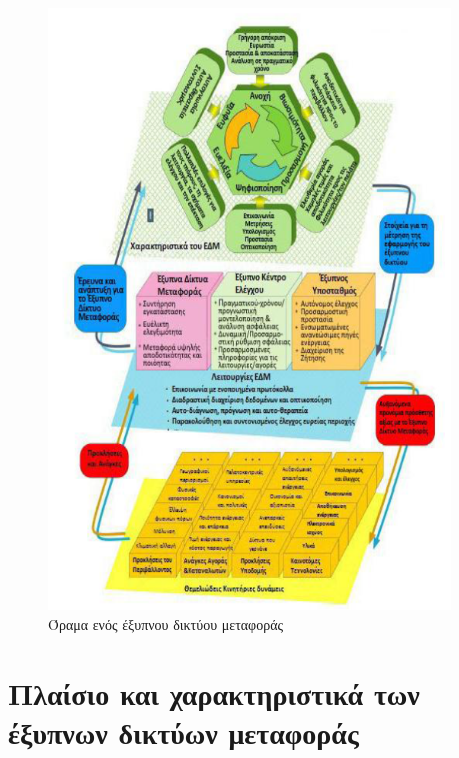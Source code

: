 \documentclass[12pt, a4paper, oneside]{report}
\begin{document}
\begin{figure}[tp]
\centering
\includegraphics[width=0.95\textwidth]{eikona_02}
\caption[Όραμα ενός έξυπνου δικτύου μεταφοράς]{Όραμα ενός έξυπνου δικτύου μεταφοράς\cite{zwtou}}
\end{figure}
\clearpage

\section{Πλαίσιο και χαρακτηριστικά των έξυπνων δικτύων μεταφοράς}
\end{document}
